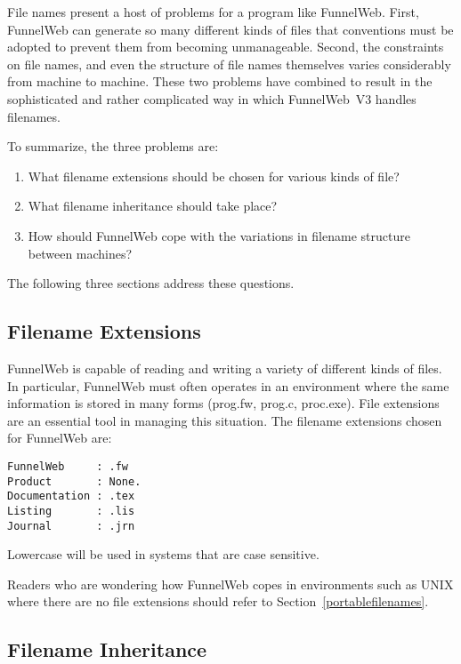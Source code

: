 File names present a host of problems for a program like FunnelWeb.
First, FunnelWeb can generate so many different kinds of files that
conventions must be adopted to prevent them from becoming unmanageable.
Second, the constraints on file names, and even the structure of file
names themselves varies considerably from machine to machine. These two
problems have combined to result in the sophisticated and
rather complicated way in which FunnelWeb~V3 handles filenames.

To summarize, the three problems are:

\begin{enumerate}
\item What filename extensions should be chosen for various kinds of file?
\item What filename inheritance should take place?
\item How should FunnelWeb cope with the variations in filename structure
between machines?
\end{enumerate}

The following three sections address these questions.

\subsection{Filename Extensions}

FunnelWeb is capable of reading and writing a variety of different kinds
of files. In particular, FunnelWeb must often operates in an environment where
the same information is stored in many forms (\eg{}prog.fw, prog.c, proc.exe).
File extensions are an essential tool in managing this situation.
The filename extensions chosen for FunnelWeb are:

\begin{verbatim}
FunnelWeb     : .fw
Product       : None.
Documentation : .tex
Listing       : .lis
Journal       : .jrn
\end{verbatim}

Lowercase will be used in systems that are case sensitive.

Readers who are wondering how FunnelWeb copes in environments such as UNIX
where there are no file extensions should refer to
Section~\ref{portablefilenames}.

\subsection{Filename Inheritance}

